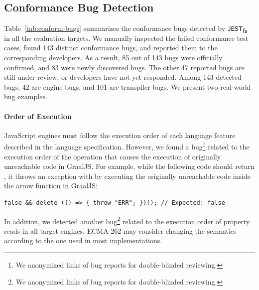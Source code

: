 

\subsection{Conformance Bug Detection}\label{sec:conform-bug}


Table~\ref{tab:conform-bugs} summarizes the conformance bugs
detected by $\textsf{\small JEST}_{\textsf{\small fs}}$ in all the evaluation targets.
We manually inspected the failed conformance test cases,
found 143 distinct conformance bugs, and reported them to
the corresponding developers.
%
As a result, 85 out of 143 bugs were officially confirmed, and
83 were newly discovered bugs.
%
The other 47 reported bugs are still under review, or developers have
not yet responded.
%
Among 143 detected bugs, 42 are engine bugs, and 101 are
transpiler bugs.
We present two real-world bug examples.


\paragraph{\textbf{Order of Execution}}
%
JavaScript engines must follow the execution order of each language feature
described in the language specification.
%
However, we found a bug\footnote{
  We anonymized links of bug reports for double-blinded reviewing.
} related to the execution order of the  operation that causes
the execution of originally unreachable code in GraalJS.
%
For example, while the following code should return , it throws an
exception with  by executing the originally unreachable code
inside the arrow function in GraalJS:
%
\begin{lstlisting}[style=JS, basicstyle=\footnotesize\ttfamily]
    false && delete (() => { throw "ERR"; })(); // Expected: false
\end{lstlisting}
%
In addition, we detected another bug\footnote{
  We anonymized links of bug reports for double-blinded reviewing.
} related to the execution order of property reads
%
%
%
in all target engines. ECMA-262 may consider changing the semantics
according to the one used in most implementations.

